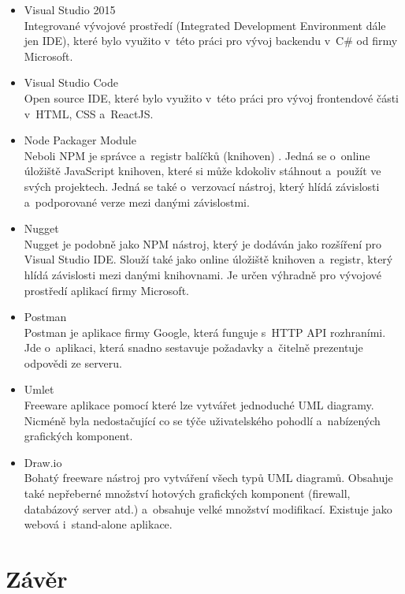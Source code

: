 \begin{itemize}
	\item Visual Studio 2015 \\
	Integrované vývojové prostředí (Integrated Development Environment dále jen IDE), které bylo využito v~této práci pro vývoj backendu v~C\# od firmy Microsoft. 
	\item Visual Studio Code \\
	Open source IDE, které bylo využito v~této práci pro vývoj frontendové části v~HTML, CSS a~ReactJS.
	\item Node Packager Module \\
	Neboli NPM je správce a~registr balíčků (knihoven) . Jedná se o~online úložiště JavaScript knihoven, které si může kdokoliv stáhnout a~použít ve svých projektech. Jedná se také o~verzovací nástroj, který hlídá závislosti a~podporované verze mezi danými závislostmi. 
	\item Nugget \\
	Nugget je podobně jako NPM nástroj, který je dodáván jako rozšíření pro Visual Studio IDE. Slouží také jako online úložiště knihoven a~registr, který hlídá závislosti mezi danými knihovnami. Je určen výhradně pro vývojové prostředí aplikací firmy Microsoft.
	\item Postman \\
	Postman je aplikace firmy Google, která funguje s~HTTP API rozhraními. Jde o~aplikaci, která snadno sestavuje požadavky a~čitelně prezentuje odpovědi ze serveru.
	\item Umlet \\
	Freeware aplikace pomocí které lze vytvářet jednoduché UML diagramy. Nicméně byla nedostačující co se týče uživatelského pohodlí a~nabízených grafických komponent.
	\item Draw.io \\
	Bohatý freeware nástroj pro vytváření všech typů UML diagramů. Obsahuje také nepřeberné množství hotových grafických komponent (firewall, databázový server atd.) a~obsahuje velké množství modifikací. Existuje jako webová i~stand-alone aplikace.
\end{itemize}

\section{Závěr}

